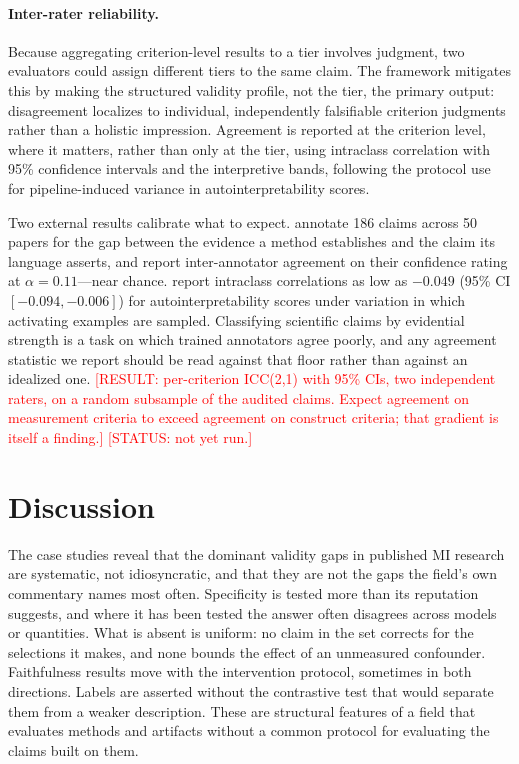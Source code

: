 \documentclass{article}
\begin{document}
\paragraph{Inter-rater reliability.} Because aggregating criterion-level results to a tier involves judgment, two evaluators could assign different tiers to the same claim. The framework mitigates this by making the structured validity profile, not the tier, the primary output: disagreement localizes to individual, independently falsifiable criterion judgments rather than a holistic impression. Agreement is reported at the criterion level, where it matters, rather than only at the tier, using intraclass correlation with 95\% confidence intervals and the \citet{koo2016guideline} interpretive bands, following the protocol \citet{vandenben2026building} use for pipeline-induced variance in autointerpretability scores.

Two external results calibrate what to expect. \citet{joshi2026causality} annotate 186 claims across 50 papers for the gap between the evidence a method establishes and the claim its language asserts, and report inter-annotator agreement on their confidence rating at $\alpha = 0.11$---near chance. \citet{vandenben2026building} report intraclass correlations as low as $-0.049$ (95\% CI $[-0.094, -0.006]$) for autointerpretability scores under variation in which activating examples are sampled. Classifying scientific claims by evidential strength is a task on which trained annotators agree poorly, and any agreement statistic we report should be read against that floor rather than against an idealized one. \textcolor{red}{[RESULT: per-criterion ICC(2,1) with 95\% CIs, two independent raters, on a random subsample of the audited claims. Expect agreement on measurement criteria to exceed agreement on construct criteria; that gradient is itself a finding.]} \textcolor{red}{[STATUS: not yet run.]}

\section{Discussion}
\label{sec:discussion}

The case studies reveal that the dominant validity gaps in published MI research are systematic, not idiosyncratic, and that they are not the gaps the field's own commentary names most often. Specificity is tested more than its reputation suggests, and where it has been tested the answer often disagrees across models or quantities. What is absent is uniform: no claim in the set corrects for the selections it makes, and none bounds the effect of an unmeasured confounder. Faithfulness results move with the intervention protocol, sometimes in both directions. Labels are asserted without the contrastive test that would separate them from a weaker description. These are structural features of a field that evaluates methods and artifacts without a common protocol for evaluating the claims built on them.
\end{document}

